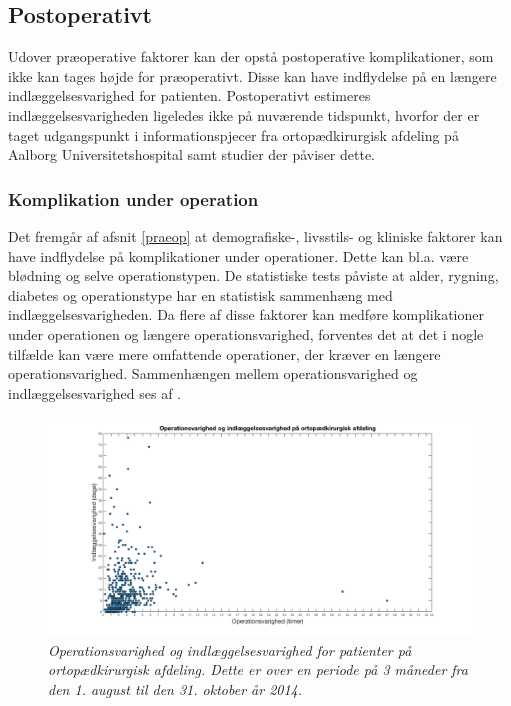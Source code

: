 \subsection{Postoperativt} \label{postop}
Udover præoperative faktorer kan der opstå postoperative komplikationer, som ikke kan tages højde for præoperativt. Disse kan have indflydelse på en længere indlæggelsesvarighed for patienten. Postoperativt estimeres indlæggelsesvarigheden ligeledes ikke på nuværende tidspunkt, hvorfor der er taget udgangspunkt i informationspjecer fra ortopædkirurgisk afdeling på Aalborg Universitetshospital samt studier der påviser dette.

\subsubsection{Komplikation under operation}
Det fremgår af afsnit \ref{praeop} at demografiske-, livsstils- og kliniske faktorer kan have indflydelse på komplikationer under operationer. Dette kan bl.a. være blødning og selve operationstypen. De statistiske tests påviste at alder, rygning, diabetes og operationstype har en statistisk sammenhæng med indlæggelsesvarigheden. Da flere af disse faktorer kan medføre komplikationer under operationen og længere operationsvarighed, forventes det at det i nogle tilfælde kan være mere omfattende operationer, der kræver en længere operationsvarighed. Sammenhængen mellem operationsvarighed og indlæggelsesvarighed ses af .


\begin{figure}[H]
	\centering
	\includegraphics[scale=0.35]{figures/opindlaeg.png}
	\caption{\textit{Operationsvarighed og indlæggelsesvarighed for patienter på ortopædkirurgisk afdeling. Dette er over en periode på 3 måneder fra den 1. august til den 31. oktober år 2014.}}
	\label{opindlaeg}
	\end{figure}

